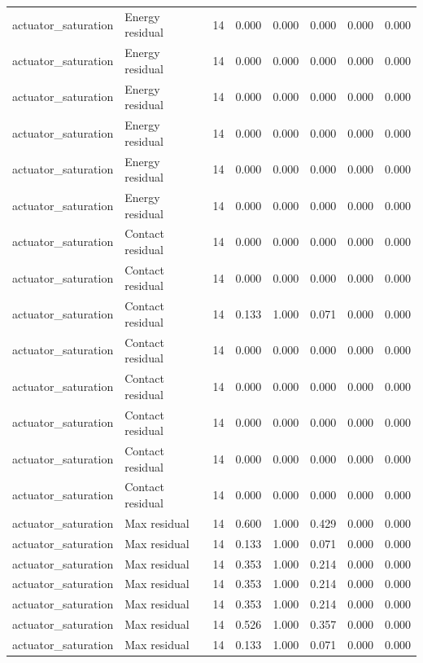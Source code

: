 {\begin{longtable}{llrrrrrr}
actuator\_saturation & Energy residual & 14 & 0.000 & 0.000 & 0.000 & 0.000 & 0.000 \\
actuator\_saturation & Energy residual & 14 & 0.000 & 0.000 & 0.000 & 0.000 & 0.000 \\
actuator\_saturation & Energy residual & 14 & 0.000 & 0.000 & 0.000 & 0.000 & 0.000 \\
actuator\_saturation & Energy residual & 14 & 0.000 & 0.000 & 0.000 & 0.000 & 0.000 \\
actuator\_saturation & Energy residual & 14 & 0.000 & 0.000 & 0.000 & 0.000 & 0.000 \\
actuator\_saturation & Energy residual & 14 & 0.000 & 0.000 & 0.000 & 0.000 & 0.000 \\
actuator\_saturation & Contact residual & 14 & 0.000 & 0.000 & 0.000 & 0.000 & 0.000 \\
actuator\_saturation & Contact residual & 14 & 0.000 & 0.000 & 0.000 & 0.000 & 0.000 \\
actuator\_saturation & Contact residual & 14 & 0.133 & 1.000 & 0.071 & 0.000 & 0.000 \\
actuator\_saturation & Contact residual & 14 & 0.000 & 0.000 & 0.000 & 0.000 & 0.000 \\
actuator\_saturation & Contact residual & 14 & 0.000 & 0.000 & 0.000 & 0.000 & 0.000 \\
actuator\_saturation & Contact residual & 14 & 0.000 & 0.000 & 0.000 & 0.000 & 0.000 \\
actuator\_saturation & Contact residual & 14 & 0.000 & 0.000 & 0.000 & 0.000 & 0.000 \\
actuator\_saturation & Contact residual & 14 & 0.000 & 0.000 & 0.000 & 0.000 & 0.000 \\
actuator\_saturation & Max residual & 14 & 0.600 & 1.000 & 0.429 & 0.000 & 0.000 \\
actuator\_saturation & Max residual & 14 & 0.133 & 1.000 & 0.071 & 0.000 & 0.000 \\
actuator\_saturation & Max residual & 14 & 0.353 & 1.000 & 0.214 & 0.000 & 0.000 \\
actuator\_saturation & Max residual & 14 & 0.353 & 1.000 & 0.214 & 0.000 & 0.000 \\
actuator\_saturation & Max residual & 14 & 0.353 & 1.000 & 0.214 & 0.000 & 0.000 \\
actuator\_saturation & Max residual & 14 & 0.526 & 1.000 & 0.357 & 0.000 & 0.000 \\
actuator\_saturation & Max residual & 14 & 0.133 & 1.000 & 0.071 & 0.000 & 0.000 \\

\end{longtable}}
